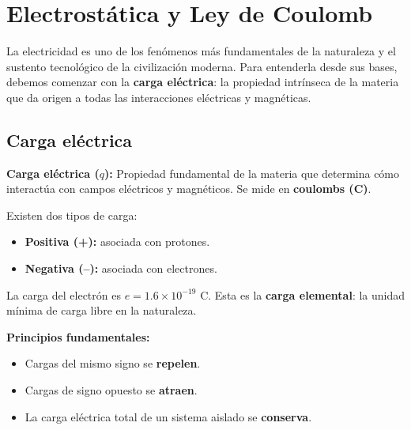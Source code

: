 
\renewcommand{\tema}{Electromagnetismo}

\section{Electrostática y Ley de Coulomb}

\begin{seccion}
La electricidad es uno de los fenómenos más fundamentales de la naturaleza y el sustento tecnológico de la civilización moderna. Para entenderla desde sus bases, debemos comenzar con la \textbf{carga eléctrica}: la propiedad intrínseca de la materia que da origen a todas las interacciones eléctricas y magnéticas.
\end{seccion}

\subsection{Carga eléctrica}

\begin{seccion}
\begin{definicion}
\textbf{Carga eléctrica ($q$):} Propiedad fundamental de la materia que determina cómo interactúa con campos eléctricos y magnéticos. Se mide en \textbf{coulombs (C)}.
\end{definicion}

Existen dos tipos de carga:
\begin{itemize}
    \item \textbf{Positiva (+):} asociada con protones.
    \item \textbf{Negativa (--):} asociada con electrones.
\end{itemize}

La carga del electrón es $e = 1.6 \times 10^{-19}$ C. Esta es la \textbf{carga elemental}: la unidad mínima de carga libre en la naturaleza.

\textbf{Principios fundamentales:}
\begin{itemize}
    \item Cargas del mismo signo se \textbf{repelen}.
    \item Cargas de signo opuesto se \textbf{atraen}.
    \item La carga eléctrica total de un sistema aislado se \textbf{conserva}.
\end{itemize}
\end{seccion}

